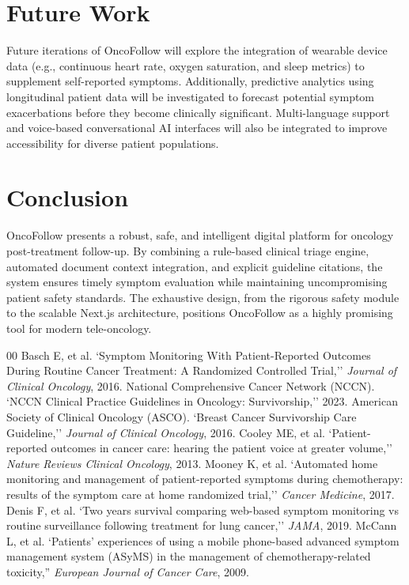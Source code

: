 \documentclass[10pt,journal,compsoc]{IEEEtran}
\begin{document}
\section{Future Work}
Future iterations of OncoFollow will explore the integration of wearable device data (e.g., continuous heart rate, oxygen saturation, and sleep metrics) to supplement self-reported symptoms. Additionally, predictive analytics using longitudinal patient data will be investigated to forecast potential symptom exacerbations before they become clinically significant. Multi-language support and voice-based conversational AI interfaces will also be integrated to improve accessibility for diverse patient populations.

\section{Conclusion}
OncoFollow presents a robust, safe, and intelligent digital platform for oncology post-treatment follow-up. By combining a rule-based clinical triage engine, automated document context integration, and explicit guideline citations, the system ensures timely symptom evaluation while maintaining uncompromising patient safety standards. The exhaustive design, from the rigorous safety module to the scalable Next.js architecture, positions OncoFollow as a highly promising tool for modern tele-oncology.

\begin{thebibliography}{00}
 Basch E, et al. `Symptom Monitoring With Patient-Reported Outcomes During Routine Cancer Treatment: A Randomized Controlled Trial,'' \textit{Journal of Clinical Oncology}, 2016.
 National Comprehensive Cancer Network (NCCN). `NCCN Clinical Practice Guidelines in Oncology: Survivorship,'' 2023.
 American Society of Clinical Oncology (ASCO). `Breast Cancer Survivorship Care Guideline,'' \textit{Journal of Clinical Oncology}, 2016.
 Cooley ME, et al. `Patient-reported outcomes in cancer care: hearing the patient voice at greater volume,'' \textit{Nature Reviews Clinical Oncology}, 2013.
 Mooney K, et al. `Automated home monitoring and management of patient-reported symptoms during chemotherapy: results of the symptom care at home randomized trial,'' \textit{Cancer Medicine}, 2017.
 Denis F, et al. `Two years survival comparing web-based symptom monitoring vs routine surveillance following treatment for lung cancer,'' \textit{JAMA}, 2019.
 McCann L, et al. `Patients' experiences of using a mobile phone-based advanced symptom management system (ASyMS) in the management of chemotherapy-related toxicity,'' \textit{European Journal of Cancer Care}, 2009.
\end{thebibliography}
\end{document}
